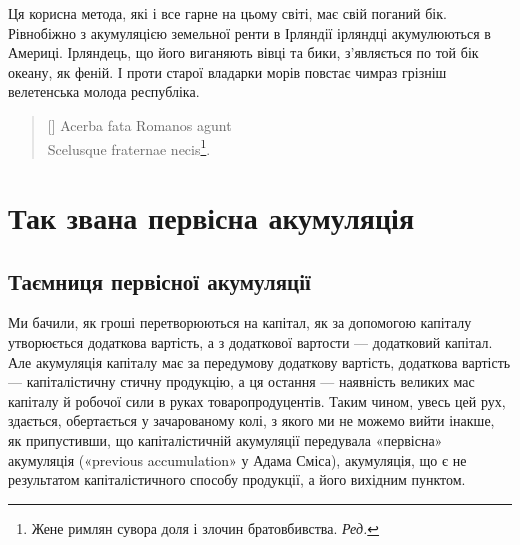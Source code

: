 Ця корисна метода, які і все гарне на цьому світі, має свій
поганий бік. Рівнобіжно з акумуляцією земельної ренти в Ірляндії
ірляндці акумулюються в Америці. Ірляндець, що його виганяють
вівці та бики, з’являється по той бік океану, як феній.
І проти старої владарки морів повстає чимраз грізніш велетенська
молода республіка.

\settowidth{\versewidth}{Scelusque fraternae necis.}
\begin{verse}[\versewidth]
Acerba fata Romanos agunt \\
Scelusque fraternae necis\footnote*{
Жене римлян сувора доля і злочин братовбивства. \emph{Ред.}
}.
\end{verse}

\section{Так звана первісна акумуляція}

\subsection{Таємниця первісної акумуляції}

Ми бачили, як гроші перетворюються на капітал, як за допомогою
капіталу утворюється додаткова вартість, а з додаткової
вартости — додатковий капітал. Але акумуляція капіталу має за
передумову додаткову вартість, додаткова вартість — капіталістичну
стичну продукцію, а ця остання — наявність великих мас капіталу
й робочої сили в руках товаропродуцентів. Таким чином,
увесь цей рух, здається, обертається у зачарованому колі, з
якого ми не можемо вийти інакше, як припустивши, що капіталістичній
акумуляції передувала «первісна» акумуляція («previous
accumulation» у Адама Сміса), акумуляція, що є не результатом
капіталістичного способу продукції, а його вихідним пунктом.

